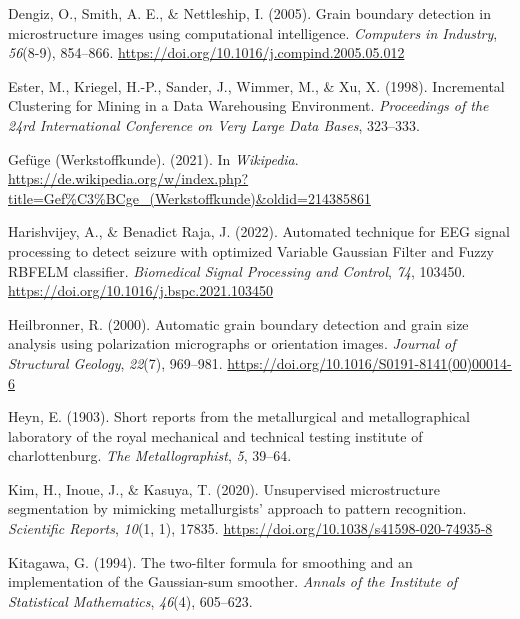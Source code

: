 \documentclass[
  12pt,
]{book}
\newlength{\cslhangindent}
\newlength{\cslentryspacingunit} %
\newenvironment{CSLReferences}[2] %
 {%
  \setlength{\parindent}{0pt}
  \ifodd #1
  \let\oldpar\par
  \def\par{\hangindent=\cslhangindent\oldpar}
  \fi
  \setlength{\parskip}{#2\cslentryspacingunit}
 }%
 {}
\begin{document}
\begin{CSLReferences}{1}{0}
\leavevmode{}%
Dengiz, O., Smith, A. E., \& Nettleship, I. (2005). Grain boundary detection in microstructure images using computational intelligence. \emph{Computers in Industry}, \emph{56}(8-9), 854--866. \url{https://doi.org/10.1016/j.compind.2005.05.012}

\leavevmode{}%
Ester, M., Kriegel, H.-P., Sander, J., Wimmer, M., \& Xu, X. (1998). Incremental {Clustering} for {Mining} in a {Data Warehousing Environment}. \emph{Proceedings of the 24rd {International Conference} on {Very Large Data Bases}}, 323--333.

\leavevmode{}%
Gefüge (Werkstoffkunde). (2021). In \emph{Wikipedia}. \url{https://de.wikipedia.org/w/index.php?title=Gef\%C3\%BCge_(Werkstoffkunde)\&oldid=214385861}

\leavevmode{}%
Harishvijey, A., \& Benadict Raja, J. (2022). Automated technique for {EEG} signal processing to detect seizure with optimized {Variable Gaussian Filter} and {Fuzzy RBFELM} classifier. \emph{Biomedical Signal Processing and Control}, \emph{74}, 103450. \url{https://doi.org/10.1016/j.bspc.2021.103450}

\leavevmode{}%
Heilbronner, R. (2000). Automatic grain boundary detection and grain size analysis using polarization micrographs or orientation images. \emph{Journal of Structural Geology}, \emph{22}(7), 969--981. \url{https://doi.org/10.1016/S0191-8141(00)00014-6}

\leavevmode{}%
Heyn, E. (1903). Short reports from the metallurgical and metallographical laboratory of the royal mechanical and technical testing institute of charlottenburg. \emph{The Metallographist}, \emph{5}, 39--64.

\leavevmode{}%
Kim, H., Inoue, J., \& Kasuya, T. (2020). Unsupervised microstructure segmentation by mimicking metallurgists' approach to pattern recognition. \emph{Scientific Reports}, \emph{10}(1, 1), 17835. \url{https://doi.org/10.1038/s41598-020-74935-8}

\leavevmode{}%
Kitagawa, G. (1994). The two-filter formula for smoothing and an implementation of the {Gaussian-sum} smoother. \emph{Annals of the Institute of Statistical Mathematics}, \emph{46}(4), 605--623.


\end{CSLReferences}
\end{document}
